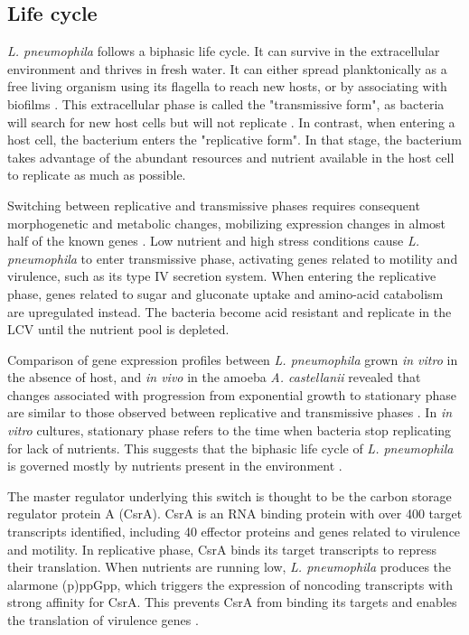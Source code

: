 \subsection{Life cycle}
\textit{L. pneumophila} follows a biphasic life cycle. It can survive in the extracellular environment and thrives in fresh water. It can either spread planktonically as a free living organism using its flagella to reach new hosts, or by associating with biofilms \citep{hilbiLegionellaSppOutdoors2011,steinertLegionellaPneumophilaAquatic2002}. This extracellular phase is called the "transmissive form", as bacteria will search for new host cells but will not replicate \cite{byrneExpressionLegionellaPneumophilaVirulence1998}. In contrast, when entering a host cell, the bacterium enters the "replicative form". In that stage, the  bacterium takes advantage of the abundant resources and nutrient available in the host cell to replicate as much as possible.

Switching between replicative and transmissive phases requires consequent morphogenetic and metabolic changes, mobilizing expression changes in almost half of the known genes \cite{steinertLegionellaPneumophilaAquatic2002}. Low nutrient and high stress conditions cause \textit{L. pneumophila} to enter transmissive phase, activating genes related to motility and virulence, such as its type IV secretion system. When entering the replicative phase, genes related to sugar and gluconate uptake and amino-acid catabolism are upregulated instead. The bacteria become acid resistant and replicate in the \acrshort{LCV} until the nutrient pool is depleted.

Comparison of gene expression profiles between \textit{L. pneumophila} grown \textit{in vitro} in the absence of host, and \textit{in vivo} in the amoeba \textit{A. castellanii} revealed that changes associated with progression from exponential growth to stationary phase are similar to those observed between replicative and transmissive phases \cite{bruggemannVirulenceStrategiesInfecting2006}. In \textit{in vitro} cultures, stationary phase refers to the time when bacteria stop replicating for lack of nutrients. This suggests that the biphasic life cycle of \textit{L. pneumophila} is governed mostly by nutrients present in the environment \cite{olivaLifeCyclePneumophila2018}.

The master regulator underlying this switch is thought to be the carbon storage regulator protein A (CsrA). CsrA is an RNA binding protein with over 400 target transcripts identified, including 40 effector proteins and genes related to virulence and motility. In replicative phase, CsrA binds its target transcripts to repress their translation. When nutrients are running low, \textit{L. pneumophila} produces the alarmone (p)ppGpp, which triggers the expression of noncoding transcripts with strong affinity for CsrA. This prevents CsrA from binding its targets and enables the translation of virulence genes \cite{sahrLegionellaPneumophilaGenome2017}.

